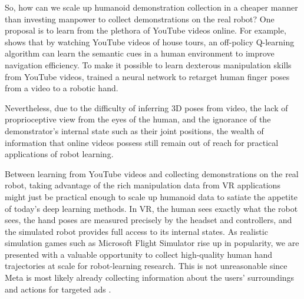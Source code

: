 So, how can we scale up humanoid demonstration collection in a cheaper manner than investing manpower to collect demonstrations on the real robot? 
One proposal is to learn from the plethora of YouTube videos online. 
For example, \cite{chang2020semantic} shows that by watching YouTube videos of house tours, an off-policy Q-learning algorithm can learn the semantic cues in a human environment to improve navigation efficiency. To make it possible to learn dexterous manipulation skills from YouTube videos, \cite{sivakumar2022robotic} trained a neural network to retarget human finger poses from a video to a robotic hand. 

Nevertheless, due to the difficulty of inferring 3D poses from video, the lack of proprioceptive view from the eyes of the human, and the ignorance of the demonstrator's internal state such as their joint positions, the wealth of information that online videos possess still remain out of reach for practical applications of robot learning. 

Between learning from YouTube videos and collecting demonstrations on the real robot, taking advantage of the rich manipulation data from VR applications might just be practical enough to scale up humanoid data to satiate the appetite of today's deep learning methods. In VR, the human sees exactly what the robot sees, the hand poses are measured precisely by the headset and controllers, and the simulated robot provides full access to its internal states. As realistic simulation games such as Microsoft Flight Simulator rise up in popularity, we are presented with a valuable opportunity to collect high-quality human hand trajectories at scale for robot-learning research. This is not unreasonable since Meta is most likely already collecting information about the users' surroundings and actions for targeted ads \cite{oculus-privacy}.
